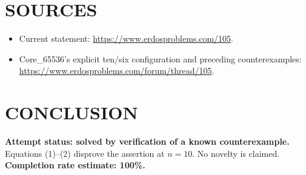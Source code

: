 \section{SOURCES}
\begin{itemize}
\item Current statement: \url{https://www.erdosproblems.com/105}.
\item Core\_65536's explicit ten/six configuration and preceding counterexamples: \url{https://www.erdosproblems.com/forum/thread/105}.
\end{itemize}

\section{CONCLUSION}
\textbf{Attempt status: solved by verification of a known counterexample.} Equations (1)--(2) disprove the assertion at $n=10$. No novelty is claimed.
\textbf{Completion rate estimate: 100\%.}
